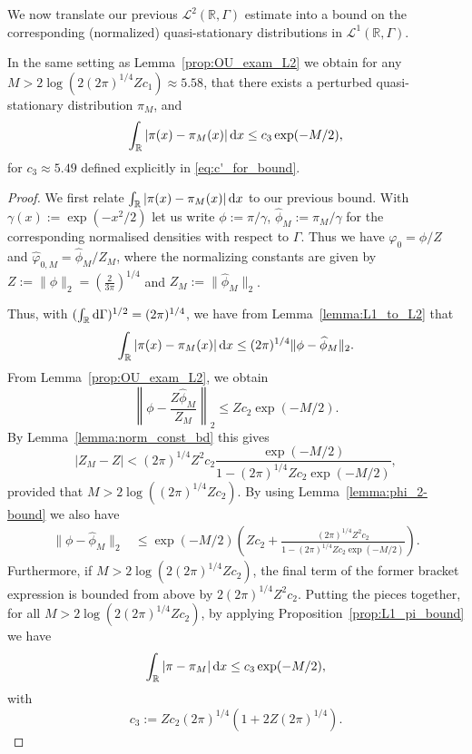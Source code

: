 \documentclass{aptpub}
\newcommand{\R}{\mathbb R}
\begin{document}
We now translate our previous $\mathcal L^2(\R,\Gamma)$ estimate into a bound on the corresponding (normalized) quasi-stationary distributions in $\mathcal L^1(\R,\Gamma)$.
\begin{proposition}
    In the same setting as Lemma~\ref{prop:OU_exam_L2} we obtain 
    for any $M> 2\log\left(2(2\pi)^{1/4} Zc_1\right)\approx 5.58$,
   that there exists a perturbed quasi-stationary distribution $\pi_M$, and
    \begin{equation}
        \label{eq: final_est}
            \int_\R |\pi(x)-\pi_M(x)|\dif x\le c_3\exp(-M/2),
    \end{equation}
    for $c_3\approx 5.49$ 
    defined explicitly in \eqref{eq:c'_for_bound}.
    \label{prop:unbdd_L1}
\end{proposition}
\begin{proof}
    We first relate $\int_\R |\pi(x)- \pi_M(x)|\dif x$ to our previous bound. 
    With $\gamma(x):= \exp(-x^2/2)$ let us write $\phi:= \pi/\gamma$, $\widehat\phi_M:=\pi_M/\gamma$ for the corresponding normalised densities with respect to $\Gamma$. Thus we have $\varphi_0 = \phi/Z$ and $\widehat\varphi_{0,M} = \widehat\phi_M/Z_M$, where the normalizing constants are given by $Z := \|\phi\|_2 = (\frac{2}{3\pi})^{1/4}$ and $Z_M := \|\widehat\phi_M\|_2$.
    
    Thus, with $(\int_{\R} \dif \Gamma)^{1/2}=(2\pi)^{1/4}$,  we have from Lemma~\ref{lemma:L1_to_L2} that
    \begin{align*}
        \int_\R |\pi(x)-\pi_M(x)|\dif x \le
        (2\pi)^{1/4} \|\phi-\widehat\phi_M\|_2 .
    \end{align*}
    From Lemma~\ref{prop:OU_exam_L2}, we obtain
    \begin{equation}
        \left \|\phi - \frac{Z\widehat\phi_M}{Z_M}\right \|_2 \le Zc_2 \exp(-M/2).
        \label{eq:phi_phi_M_bd}
    \end{equation}
    By
    Lemma~\ref{lemma:norm_const_bd} this gives
    \begin{equation*}
        |Z_M-Z|< (2\pi)^{1/4}Z^2 c_2 \frac{\exp(-M/2)}{1-(2\pi)^{1/4} Zc_2\exp(-M/2)},
    \end{equation*}
    provided that $M>2\log((2\pi)^{1/4} Zc_2)$.
    By using Lemma~\ref{lemma:phi_2-bound}
    we also have
    \begin{align*}
        \|\phi-\widehat\phi_M\|_2 &\le 
        \exp(-M/2) \left(  Zc_2+ \frac {(2\pi)^{1/4}Z^2 c_2}{1-(2\pi)^{1/4} Zc_2\exp(-M/2)}  \right).
    \end{align*}
    Furthermore, if $M>2\log\left(2(2\pi)^{1/4} Zc_2\right)$, the final term of the former bracket expression is bounded from above by $2(2\pi)^{1/4} Z^2 c_2$. Putting the pieces together, for all $M>2\log\left(2(2\pi)^{1/4} Zc_2\right)$, by applying Proposition~\ref{prop:L1_pi_bound} we have
    \begin{equation*}
        \int_{\R}|\pi-\pi_M|\dif x \le c_3 \exp(-M/2),
    \end{equation*}
    with 
    \begin{equation}        \label{eq:c'_for_bound}
        c_3 := Zc_2(2\pi)^{1/4}\left( 1+ {2Z(2\pi)^{1/4} } \right).
    \end{equation}
\end{proof}
\end{document}
